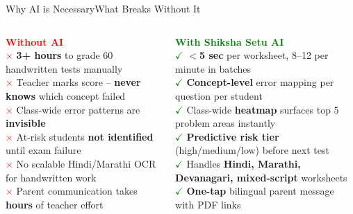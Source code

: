 \documentclass[aspectratio=169,10pt]{beamer}
\begin{document}
\begin{frame}[t,shrink=5]{Why AI is Necessary}{What Breaks Without It}
\begin{columns}[T]

\vspace{4pt}
\colorbox{card}{\parbox{0.92\linewidth}{%
  \vspace{4pt}
  \textcolor{red}{\small\textbf{Without AI}}\\[5pt]
  \textcolor{red}{\scriptsize$\times$} \textcolor{txt}{\scriptsize \textbf{3+ hours} to grade 60 handwritten tests manually}\\[3pt]
  \textcolor{red}{\scriptsize$\times$} \textcolor{txt}{\scriptsize Teacher marks score -- \textbf{never knows} which concept failed}\\[3pt]
  \textcolor{red}{\scriptsize$\times$} \textcolor{txt}{\scriptsize Class-wide error patterns are \textbf{invisible}}\\[3pt]
  \textcolor{red}{\scriptsize$\times$} \textcolor{txt}{\scriptsize At-risk students \textbf{not identified} until exam failure}\\[3pt]
  \textcolor{red}{\scriptsize$\times$} \textcolor{txt}{\scriptsize No scalable Hindi/Marathi OCR for handwritten work}\\[3pt]
  \textcolor{red}{\scriptsize$\times$} \textcolor{txt}{\scriptsize Parent communication takes \textbf{hours} of teacher effort}\\[4pt]
}}

\vspace{4pt}
\colorbox{card}{\parbox{0.92\linewidth}{%
  \vspace{4pt}
  \textcolor{green}{\small\textbf{With Shiksha Setu AI}}\\[5pt]
  \textcolor{green}{\scriptsize$\checkmark$} \textcolor{txt}{\scriptsize \textbf{$<$5 sec} per worksheet, 8--12 per minute in batches}\\[3pt]
  \textcolor{green}{\scriptsize$\checkmark$} \textcolor{txt}{\scriptsize \textbf{Concept-level} error mapping per question per student}\\[3pt]
  \textcolor{green}{\scriptsize$\checkmark$} \textcolor{txt}{\scriptsize Class-wide \textbf{heatmap} surfaces top 5 problem areas instantly}\\[3pt]
  \textcolor{green}{\scriptsize$\checkmark$} \textcolor{txt}{\scriptsize \textbf{Predictive risk tier} (high/medium/low) before next test}\\[3pt]
  \textcolor{green}{\scriptsize$\checkmark$} \textcolor{txt}{\scriptsize Handles \textbf{Hindi, Marathi, Devanagari, mixed-script} worksheets}\\[3pt]
  \textcolor{green}{\scriptsize$\checkmark$} \textcolor{txt}{\scriptsize \textbf{One-tap} bilingual parent message with PDF links}\\[4pt]
}}


\end{columns}
\end{frame}
\end{document}
